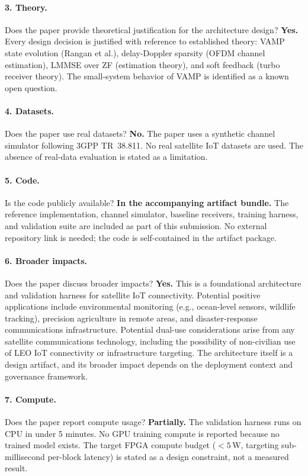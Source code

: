 \documentclass{article}
\begin{document}
\paragraph{3. Theory.}
Does the paper provide theoretical justification for the architecture design?
\textbf{Yes.} Every design decision is justified with reference to established theory: VAMP state evolution (Rangan et al.), delay-Doppler sparsity (OFDM channel estimation), LMMSE over ZF (estimation theory), and soft feedback (turbo receiver theory). The small-system behavior of VAMP is identified as a known open question.

\paragraph{4. Datasets.}
Does the paper use real datasets?
\textbf{No.} The paper uses a synthetic channel simulator following 3GPP TR~38.811. No real satellite IoT datasets are used. The absence of real-data evaluation is stated as a limitation.

\paragraph{5. Code.}
Is the code publicly available?
\textbf{In the accompanying artifact bundle.} The reference implementation, channel simulator, baseline receivers, training harness, and validation suite are included as part of this submission. No external repository link is needed; the code is self-contained in the artifact package.

\paragraph{6. Broader impacts.}
Does the paper discuss broader impacts?
\textbf{Yes.} This is a foundational architecture and validation harness for satellite IoT connectivity. Potential positive applications include environmental monitoring (e.g., ocean-level sensors, wildlife tracking), precision agriculture in remote areas, and disaster-response communications infrastructure. Potential dual-use considerations arise from any satellite communications technology, including the possibility of non-civilian use of LEO IoT connectivity or infrastructure targeting. The architecture itself is a design artifact, and its broader impact depends on the deployment context and governance framework.

\paragraph{7. Compute.}
Does the paper report compute usage?
\textbf{Partially.} The validation harness runs on CPU in under 5 minutes. No GPU training compute is reported because no trained model exists. The target FPGA compute budget ($<5$\,W, targeting sub-millisecond per-block latency) is stated as a design constraint, not a measured result.
\end{document}

